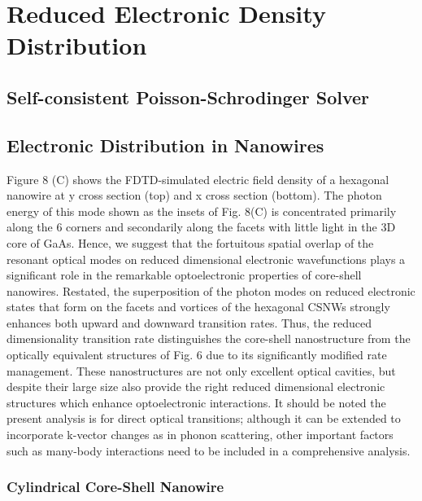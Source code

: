 \chapter{Reduced Electronic Density Distribution} \label{ED}

\section{Self-consistent Poisson-Schrodinger Solver} \label{sec:model}



\section{Electronic Distribution in Nanowires} \label{sec:spectra}

Figure 8 (C) shows the FDTD-simulated electric field density of a hexagonal
nanowire at y cross section (top) and x cross section (bottom). The photon
energy of this mode shown as the insets of Fig. 8(C) is concentrated primarily
along the 6 corners and secondarily along the facets with little light in the
3D core of GaAs. Hence, we suggest that the fortuitous spatial overlap of the
resonant optical modes on reduced dimensional electronic wavefunctions plays a
significant role in the remarkable optoelectronic properties of core-shell
nanowires. Restated, the superposition of the photon modes  on reduced
electronic states that form on the facets and vortices of the hexagonal CSNWs
strongly enhances both upward and downward transition rates.  Thus, the reduced
dimensionality transition rate distinguishes the core-shell nanostructure from
the optically equivalent structures of Fig. 6 due to its significantly modified
rate management. These nanostructures are not only excellent optical cavities,
but despite their large size also provide the right reduced dimensional
electronic structures which enhance optoelectronic interactions.  It should be
noted the present analysis is for direct optical transitions; although it can
be extended to incorporate k-vector changes as in phonon scattering, other
important factors such as many-body interactions need to be included in a
comprehensive analysis.

\subsection{Cylindrical Core-Shell Nanowire}

